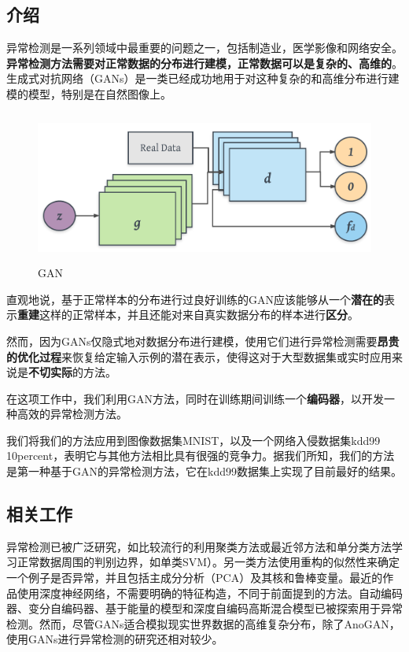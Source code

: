 \documentclass[12pt]{article}
\begin{document}
\subsection{\textbf{介绍}\label{header-n3}}

异常检测是一系列领域中最重要的问题之一，包括制造业，医学影像和网络安全。\textbf{异常检测方法需要对正常数据的分布进行建模，正常数据可以是复杂的、高维的}。生成式对抗网络（GANs）是一类已经成功地用于对这种复杂的和高维分布进行建模的模型，特别是在自然图像上。

\begin{figure}[htbp]
\centering
\includegraphics[height=5cm,width=12cm]{Report2-figure/gan.png}
\caption{GAN}
\end{figure}


直观地说，基于正常样本的分布进行过良好训练的GAN应该能够从一个\textbf{潜在的}表示\textbf{重建}这样的正常样本，并且还能对来自真实数据分布的样本进行\textbf{区分}。

然而，因为GANs仅隐式地对数据分布进行建模，使用它们进行异常检测需要\textbf{昂贵的优化过程}来恢复给定输入示例的潜在表示，使得这对于大型数据集或实时应用来说是\textbf{不切实际}的方法。

在这项工作中，我们利用GAN方法，同时在训练期间训练一个\textbf{编码器}，以开发一种高效的异常检测方法。

我们将我们的方法应用到图像数据集MNIST，以及一个网络入侵数据集kdd99
10percent，表明它与其他方法相比具有很强的竞争力。据我们所知，我们的方法是第一种基于GAN的异常检测方法，它在kdd99数据集上实现了目前最好的结果。

\subsection{\textbf{相关工作}\label{header-n11}}

异常检测已被广泛研究，如比较流行的利用聚类方法或最近邻方法和单分类方法学习正常数据周围的判别边界，如单类SVM）。另一类方法使用重构的似然性来确定一个例子是否异常，并且包括主成分分析（PCA）及其核和鲁棒变量。最近的作品使用深度神经网络，不需要明确的特征构造，不同于前面提到的方法。自动编码器、变分自编码器、基于能量的模型和深度自编码高斯混合模型已被探索用于异常检测。然而，尽管GANs适合模拟现实世界数据的高维复杂分布，除了AnoGAN，使用GANs进行异常检测的研究还相对较少。
\end{document}
